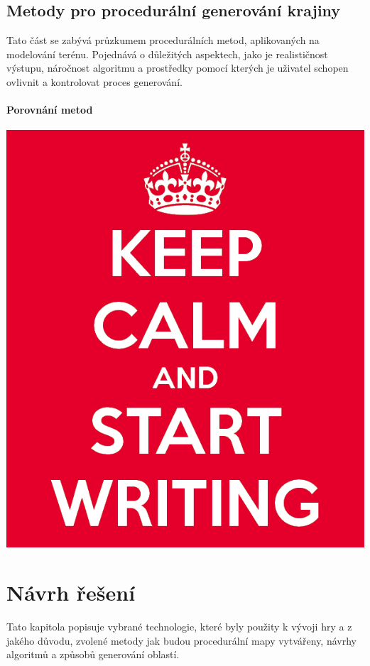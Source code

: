 \section{Metody pro procedurální generování krajiny}
Tato část se zabývá průzkumem procedurálních metod, aplikovaných na modelování terénu. Pojednává o důležitých aspektech, jako je realističnost výstupu, náročnost algoritmu a prostředky pomocí kterých je uživatel schopen ovlivnit a kontrolovat proces generování.~\cite{inproceedings}

\subsubsection{Porovnání metod}
\includegraphics[scale=0.3]{obrazky-figures/keep-calm.png}

\fi

\chapter{Návrh řešení}
\label{solution}
Tato kapitola popisuje vybrané technologie, které byly použity k vývoji hry a z jakého důvodu, zvolené metody jak budou procedurální mapy vytvářeny, návrhy algoritmů a způsobů generování oblastí. 

